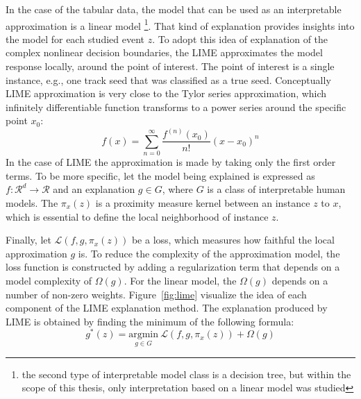 In the case of the tabular data, the model that can be used as an interpretable approximation is a linear model \footnote{the second type of interpretable model class is a decision tree, but within the scope of this thesis, only interpretation based on a linear model was studied}. 
That kind of explanation provides insights into the model for each studied event $z$. To adopt this idea of explanation of the complex nonlinear decision boundaries, the LIME approximates the model response locally, around the point of interest. The point of interest is a single instance, e.g., one track seed that was classified as a true seed.  
Conceptually LIME approximation is very close to the Tylor series approximation, which infinitely differentiable function transforms to a power series around the specific point $x_0$: 
\begin{equation}
    f(x) = \sum_{n=0}^{\infty} \frac{f^{(n)}(x_0)}{n!} (x-x_0)^n
\end{equation}
In the case of LIME the approximation is made by taking only the first order terms.  
To be more specific, let the model being explained is expressed as $f: \mathcal{R}^{d}\rightarrow  \mathcal{R} $ and an explanation $g \in G$, where $G$ is a class of interpretable human models. The $\pi_x(z)$ is a proximity measure kernel between an instance $z$ to $x$, which is essential to define the local neighborhood of instance $z$.

Finally, let $\mathcal{L}(f,g,\pi_x(z))$ be a loss, which measures how faithful the local approximation $g$ is. 
To reduce the complexity of the approximation model, the loss function is constructed by adding a regularization term that depends on a model complexity of $\Omega(g)$. For the linear model, the $\Omega(g)$ depends on a number of non-zero weights. Figure~\ref{fig:lime} visualize the idea of each component of the LIME explanation method. 
The explanation produced by LIME is obtained by finding the minimum of the following formula: 
\begin{equation} \label{eq:LIME}
    g^*(z) = \underset{{g \in G}}{\mathrm{argmin}} ~ \mathcal{L}(f,g,\pi_x(z)) + \Omega(g)
\end{equation}


